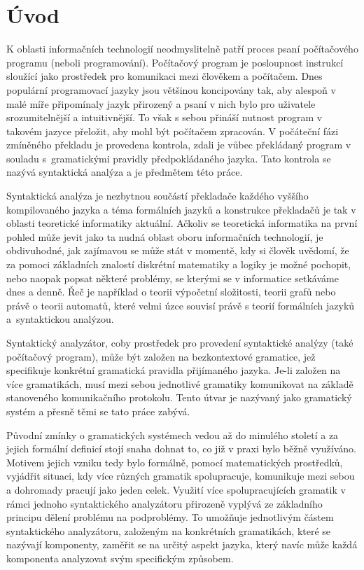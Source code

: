 \chapter{Úvod}
K oblasti informačních technologií neodmyslitelně patří proces psaní počítačového programu (neboli programování). Počítačový program
je posloupnost instrukcí sloužící jako prostředek pro komunikaci mezi člověkem a počítačem. Dnes populární programovací jazyky jsou většinou
koncipovány tak, aby alespoň v malé míře připomínaly jazyk přirozený a psaní v nich bylo pro uživatele srozumitelnější a intuitivnější.
To však s sebou přináší nutnost program v takovém jazyce přeložit, aby mohl být počítačem zpracován. V počáteční fázi zmíněného překladu
je provedena kontrola, zdali je vůbec překládaný program v souladu s~gramatickými pravidly předpokládaného jazyka. Tato kontrola se nazývá
syntaktická analýza a je předmětem této práce.

Syntaktická analýza je nezbytnou součástí překladače každého vyššího kompilovaného jazyka a
téma formálních jazyků a konstrukce překladačů je tak v oblasti teoretické informatiky aktuální.
Ačkoliv se teoretická informatika na první pohled může jevit jako ta nudná oblast oboru informačních technologií, je obdivuhodné,
jak zajímavou se může stát v momentě, kdy si člověk uvědomí, že za pomoci základních znalostí diskrétní matematiky a logiky je možné pochopit, nebo naopak popsat některé problémy,
se kterými se v informatice setkáváme dnes a denně. Řeč je například o teorii výpočetní složitosti, teorii grafů nebo právě o teorii automatů, které velmi úzce souvisí právě s
teorií formálních jazyků a~syntaktickou analýzou.

Syntaktický analyzátor, coby prostředek pro provedení syntaktické analýzy (také počítačový program), může být založen na bezkontextové
gramatice, jež specifikuje konkrétní gramatická pravidla přijímaného jazyka. Je-li založen na více gramatikách, musí mezi sebou jednotlivé
gramatiky komunikovat na základě stanoveného komunikačního protokolu. Tento útvar je nazývaný jako gramatický systém a přesně těmi
se tato práce zabývá.

Původní zmínky o gramatických systémech
vedou až do minulého století a za jejich formální definicí stojí snaha dohnat to, co již v praxi bylo běžně využíváno. Motivem jejich vzniku tedy bylo
formálně, pomocí matematických prostředků, vyjádřit situaci, kdy více různých gramatik spolupracuje, komunikuje mezi sebou a dohromady pracují jako jeden celek.
Využití více spolupracujících
gramatik v rámci jednoho syntaktického analyzátoru přirozeně vyplývá ze základního principu dělení problému na podproblémy. To umožňuje jednotlivým částem
syntaktického analyzátoru, založeným na konkrétních gramatikách, které se nazývají komponenty,
zaměřit se na určitý aspekt jazyka, který navíc může každá komponenta analyzovat svým specifickým způsobem.


